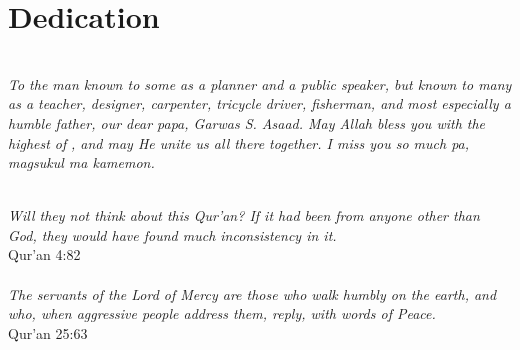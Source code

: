 \chapter*{Dedication}
\begin{center}
    \\

    \textit{To the man known to some as a planner and a public speaker, but known to many as a teacher, designer, carpenter, tricycle driver, fisherman, and most especially a humble father, our dear papa, Garwas S. Asaad. May Allah  bless you with the highest of}  \textit{, and may He unite us all there together. I miss you so much pa, magsukul ma kamemon.}\\
    \begin{minipage}{.6\linewidth}
        \centering
        \vspace{4cm}
        \\
        \textit{Will they not think about this Qur'an? If it had been from anyone other than God, they would have found much inconsistency in it.}\\
        {\sc Qur'an 4:82}\\[2cm]
        \\
        \textit{The servants of the Lord of Mercy are those who walk humbly on the earth, and who, when aggressive people address them, reply, with words of Peace.}\\
        {\sc Qur'an 25:63}\\[1cm]
    \end{minipage}
\end{center}